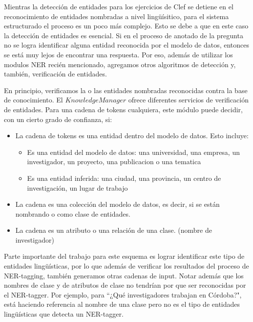 \medskip

Mientras la detección de entidades para los ejercicios de Clef se detiene en el reconocimiento de entidades nombradas a nivel lingüísitico, para el sistema estructurado el proceso es un poco más complejo. Esto se debe a que en este caso la detección de entidades es esencial. Si en el proceso de anotado de la pregunta no se logra identificar alguna entidad reconocida por el modelo de datos, entonces se está muy lejos de encontrar una respuesta. Por eso, además de utilizar los modulos NER recién mencionado, agregamos otros algoritmos de detección y, también, verificación de entidades. 

En principio, verificamos la o las entidades nombradas reconocidas contra la base de conocimiento. El $KnowledgeManager$ ofrece diferentes servicios de verificación de entidades. Para una cadena de tokens cualquiera, este módulo puede decidir, con un cierto grado de confianza, si:

\begin{itemize}
  \item La cadena de tokens es una entidad dentro del modelo de datos. Esto incluye:
    \begin{itemize}
      \item Es una entidad del modelo de datos: una universidad, una empresa, un investigador, un proyecto, una publicacion o una tematica
      \item Es una entidad inferida: una ciudad, una provincia, un centro de investigación, un lugar de trabajo
    \end{itemize}
  \item La cadena es una colección del modelo de datos, es decir, si se están nombrando  o  como clase de entidades.
  \item La cadena es un atributo o una relación de una clase. (nombre de investigador)
\end{itemize}

Parte importante del trabajo para este esquema es lograr identificar este tipo de entidades lingüísticas, por lo que además de verificar los resultados del proceso de NER-tagging, también generamos otras cadenas de input. Notar además que los nombres de clase y de atributos de clase no tendrían por que ser reconocidas por el NER-tagger. Por ejemplo, para ``¿Qué investigadores trabajan en Córdoba?",  está haciendo referencia al nombre de una clase pero no es el tipo de entidades lingüísticas que detecta un NER-tagger. 

